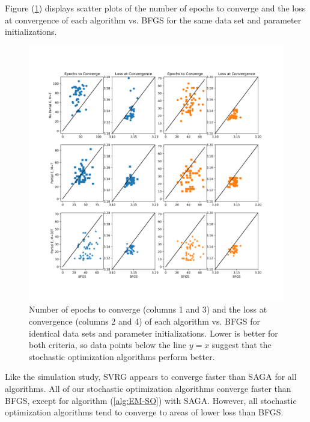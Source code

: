 Figure (\ref{fig:scatter_case}) displays scatter plots of the number of epochs to converge and the loss at convergence of each algorithm vs. BFGS for the same data set and parameter initializations.
%
\begin{figure}
    \centering
    \includegraphics[width=6.5in]{../plt/paired_scatter_case_study.png}
    \caption{Number of epochs to converge (columns 1 and 3) and the loss at convergence (columns 2 and 4) of each algorithm vs. BFGS for identical data sets and parameter initializations. Lower is better for both criteria, so data points below the line $y=x$ suggest that the stochastic optimization algorithms perform better.}
    \label{fig:scatter_case}
\end{figure}
%
Like the simulation study, SVRG appears to converge faster than SAGA for all algorithms. %
All of our stochastic optimization algorithms converge faster than BFGS, except for algorithm (\ref{alg:EM-SO}) with SAGA. However, all stochastic optimization algorithms tend to converge to areas of lower loss than BFGS. 


